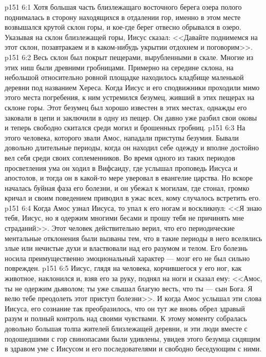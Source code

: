 \vs p151 6:1 Хотя большая часть близлежащаго восточного берега озера полого поднималась в сторону находящихся в отдалении гор, именно в этом месте возвышался крутой склон горы, и кое\hyp{}где берег отвесно обрывался в озеро. Указывая на склон близлежащей горы, Иисус сказал: <<Давайте поднимемся на этот склон, позавтракаем и в каком\hyp{}нибудь укрытии отдохнем и поговорим>>.
\vs p151 6:2 Весь склон был покрыт пещерами, вырубленными в скале. Многие из этих ниш были древними гробницами. Примерно на середине склона, на небольшой относительно ровной площадке находилось кладбище маленькой деревни под названием Хереса. Когда Иисус и его сподвижники проходили мимо этого места погребения, к ним устремился безумец, живший в этих пещерах на склоне горы. Этот безумец был хорошо известен в этих местах, однажды его заковали в цепи и заключили в одну из пещер. Он давно уже разбил свои оковы и теперь свободно скитался среди могил и брошенных гробниц.
\vs p151 6:3 На этого человека, которого звали Амос, нападали приступы безумия. Бывали довольно длительные периоды, когда он находил себе одежду и вполне достойно вел себя среди своих соплеменников. Во время одного из таких периодов просветления ума он ходил в Вифсаиду, где услышал проповедь Иисуса и апостолов, и тогда он в какой\hyp{}то мере уверовал в евангелие царства. Но вскоре началась буйная фаза его болезни, и он убежал к могилам, где стонал, громко кричал и своим поведением приводил в ужас всех, кому случалось встретить его.
\vs p151 6:4 Когда Амос узнал Иисуса, то упал к его ногам и воскликнул: <<Я знаю тебя, Иисус, но я одержим многими бесами и прошу тебя не причинять мне страданий>>. Этот человек действительно верил, что его периодические ментальные отклонения были вызваны тем, что в такие периоды в него вселялись злые или нечистые духи и властвовали над его разумом и телом. Его болезнь носила преимущественно эмоциональный характер --- мозг его не был сильно поврежден.
\vs p151 6:5 Иисус, глядя на человека, корчившегося у его ног, как животное, наклонился и, взяв его за руку, поднял на ноги и сказал ему: <<Амос, ты не одержим дьяволом; ты уже слышал благую весть, что ты --- сын Бога. Я велю тебе преодолеть этот приступ болезни>>. И когда Амос услышал эти слова Иисуса, его сознание так преобразилось, что он тут же вновь обрел здравый разум и полный контроль над своими чувствами. К этому моменту собралась довольно большая толпа жителей близлежащей деревни, и эти люди вместе с подошедшими с гор свинопасами были удивлены, увидев этого безумца сидящим в здравом уме с Иисусом и его последователями и свободно беседующим с ними.
